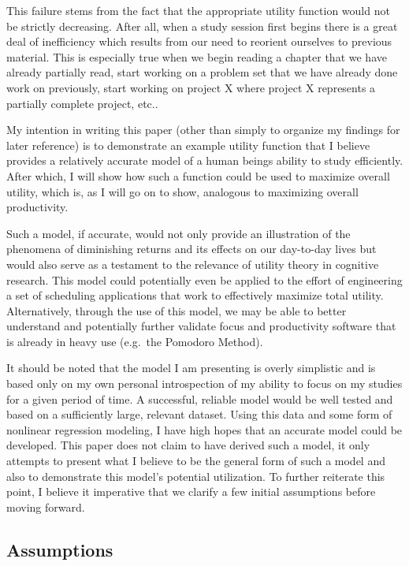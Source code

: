 \documentclass[12pt]{article}
\begin{document}
    This failure stems from the fact that the appropriate utility function would not be strictly decreasing. After all, when a study session first begins there is a great deal of inefficiency which results from our need to reorient ourselves to previous material. This is especially true when we begin reading a chapter that we have already partially read, start working on a problem set that we have already done work on previously, start working on project X where project X represents a partially complete project, etc.. 
    
    My intention in writing this paper (other than simply to organize my findings for later reference) is to demonstrate an example utility function that I believe provides a relatively accurate model of a human beings ability to study efficiently. After which, I will show how such a function could be used to maximize overall utility, which is, as I will go on to show, analogous to maximizing overall productivity.

    
    Such a model, if accurate, would not only provide an illustration of the phenomena of diminishing returns and its effects on our day-to-day lives but would also serve as a testament to the relevance of utility theory in cognitive research. This model could potentially even be applied to the effort of engineering a set of scheduling applications that work to effectively maximize total utility. Alternatively, through the use of this model, we may be able to better understand and potentially further validate focus and productivity software that is already in heavy use (e.g.\ the Pomodoro Method). 

    It should be noted that the model I am presenting is overly simplistic and is based only on my own personal introspection of my ability to focus on my studies for a given period of time. A successful, reliable model would be well tested and based on a sufficiently large, relevant dataset. Using this data and some form of nonlinear regression modeling, I have high hopes that an accurate model could be developed. This paper does not claim to have derived such a model, it only attempts to present what I believe to be the general form of such a model and also to demonstrate this model's potential utilization. To further reiterate this point, I believe it imperative that we clarify a few initial assumptions before moving forward. 

    \subsection*{Assumptions}
\end{document}
